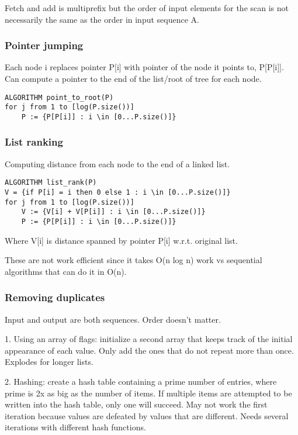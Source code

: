 Fetch and add is multiprefix but the order of input elements for the scan is not necessarily the same as the order in input sequence A.

\subsubsection{Pointer jumping}

Each node i replaces pointer P[i] with pointer of the node it points to, P[P[i]]. Can compute a pointer to the end of the list/root of tree for each node. 

\begin{lstlisting}
ALGORITHM point_to_root(P)
for j from 1 to [log(P.size())]
    P := {P[P[i]] : i \in [0...P.size()]}
\end{lstlisting}

\subsubsection{List ranking}

Computing distance from each node to the end of a linked list. 

\begin{lstlisting}
ALGORITHM list_rank(P)
V = {if P[i] = i then 0 else 1 : i \in [0...P.size()]}
for j from 1 to [log(P.size())]
    V := {V[i] + V[P[i]] : i \in [0...P.size()]}
    P := {P[P[i]] : i \in [0...P.size()]}
\end{lstlisting}

Where V[i] is distance spanned by pointer P[i] w.r.t. original list. 
    
These are not work efficient since it takes O(n log n) work vs sequential algorithms that can do it in O(n). 

\subsubsection{Removing duplicates}

Input and output are both sequences. Order doesn't matter.

1. Using an array of flags: initialize a second array that keeps track of the initial appearance of each value. Only add the ones that do not repeat more than once. Explodes for longer lists.

2. Hashing: create a hash table containing a prime number of entries, where prime is 2x as big as the number of items. If multiple items are attempted to be written into the hash table, only one will succeed. May not work the first iteration because values are defeated by values that are different. Needs several iterations with different hash functions.

